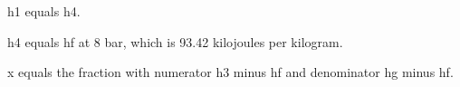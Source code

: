 h1 equals h4.

h4 equals hf at 8 bar, which is 93.42 kilojoules per kilogram.

x equals the fraction with numerator h3 minus hf and denominator hg minus hf.